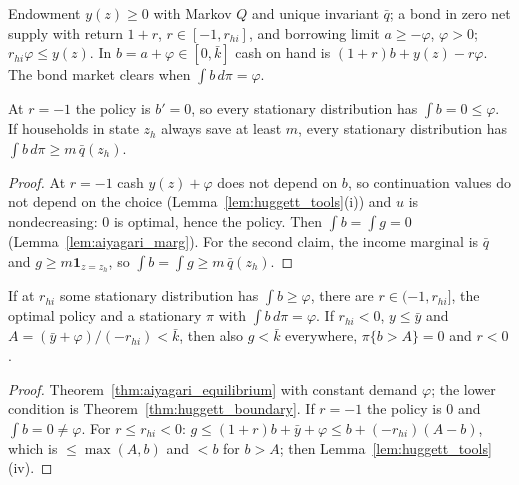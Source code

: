 \begin{definition}
\label{def:huggett}
\leanok
{}
Endowment $y(z)\ge0$ with Markov $Q$ and unique invariant $\bar q$; a bond in zero net supply with return $1+r$,
$r\in[-1,r_{hi}]$, and borrowing limit $a\ge-\varphi$, $\varphi>0$; $r_{hi}\varphi\le y(z)$. In $b = a+\varphi\in[0,\bar k]$
cash on hand is $(1+r)b + y(z) - r\varphi$. The bond market clears when $\int b\,d\pi = \varphi$.
\end{definition}

\begin{theorem}
\label{thm:huggett_boundary}
\leanok
{}
At $r=-1$ the policy is $b'=0$, so every stationary distribution has $\int b = 0\le\varphi$. If households in
state $z_h$ always save at least $m$, every stationary distribution has $\int b\,d\pi \ge m\,\bar q(z_h)$.
\end{theorem}
\begin{proof}
\leanok
At $r=-1$ cash $y(z)+\varphi$ does not depend on $b$, so continuation values do not depend on the choice
(Lemma~\ref{lem:huggett_tools}(i)) and $u$ is nondecreasing: $0$ is optimal, hence the policy.
Then $\int b = \int g = 0$ (Lemma~\ref{lem:aiyagari_marg}). For the second claim, the income marginal is
$\bar q$ and $g\ge m\mathbf 1_{z=z_h}$, so $\int b = \int g \ge m\,\bar q(z_h)$.
\end{proof}

\begin{theorem}
\label{thm:huggett_existence}
\leanok
{}
If at $r_{hi}$ some stationary distribution has $\int b\ge\varphi$, there are $r\in(-1,r_{hi}]$, the optimal policy
and a stationary $\pi$ with $\int b\,d\pi = \varphi$. If $r_{hi}<0$, $y\le\bar y$ and $A = (\bar y+\varphi)/(-r_{hi}) < \bar k$,
then also $g<\bar k$ everywhere, $\pi\{b>A\} = 0$ and $r<0$.
\end{theorem}
\begin{proof}
\leanok
Theorem~\ref{thm:aiyagari_equilibrium} with constant demand $\varphi$; the lower condition is
Theorem~\ref{thm:huggett_boundary}. If $r=-1$ the policy is $0$ and $\int b = 0\ne\varphi$. For $r\le r_{hi}<0$:
$g\le(1+r)b + \bar y + \varphi \le b + (-r_{hi})(A-b)$, which is $\le\max(A,b)$ and $<b$ for $b>A$;
then Lemma~\ref{lem:huggett_tools}(iv).
\end{proof}


